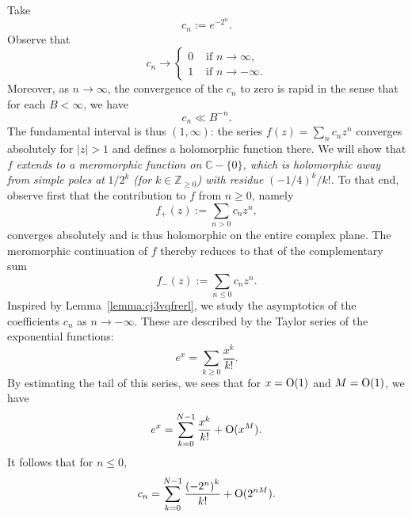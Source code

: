 \documentclass[reqno]{amsart}  \numberwithin{theorem}{section} \numberwithin{equation}{section}
\begin{document}
\begin{example}
  Take
  \begin{equation*}
    c_n:= e^{- 2^n }.
  \end{equation*}
  Observe that
  \begin{equation*}
    c_n \rightarrow
    \begin{cases}
      0 &  \text{ if } n \rightarrow \infty, \\
      1 & \text{ if } n \rightarrow - \infty.
    \end{cases}
  \end{equation*}
  Moreover, as $n \rightarrow \infty$, the convergence of the $c_n$ to zero is rapid in the sense that for each $B < \infty$, we have
  \begin{equation*}
    c_n \ll B^{-n}.
  \end{equation*}
  The fundamental interval is thus $(1,\infty)$: the series $f(z) = \sum_{n} c_n z^n$ converges absolutely for $|z| > 1$ and defines a holomorphic function there.  We will show that $f$ \emph{extends to a meromorphic function on} $\mathbb{C} - \{0\}$\emph{, which is holomorphic away from simple poles at} $1 / 2^k$ \emph{(for} $k \in \mathbb{Z}_{\geq 0}$\emph{) with residue} $(-1/4)^k / k!$\emph{.}  To that end, observe first that the contribution to $f$ from $n \geq 0$, namely
  \begin{equation*}
f_+(z) := \sum_{n > 0} c_n z^n,
\end{equation*}
converges absolutely and is thus holomorphic on the entire complex plane.  The meromorphic continuation of $f$ thereby reduces to that of the complementary sum
\begin{equation*}
f_-(z) := \sum_{n \leq  0} c_n z^n.
\end{equation*}
Inspired by Lemma~\ref{lemma:cj3vqfrerl}, we study the asymptotics of the coefficients $c_n$ as $n \rightarrow - \infty$.  These are described by the Taylor series of the exponential functions:
  \begin{equation*}
e^{x} = \sum_{k \geq 0} \frac{x^k }{k!}.
\end{equation*}
By estimating the tail of this series, we sees that for $x = \operatorname{O}(1)$ and $M = \operatorname{O}(1)$, we have
\begin{equation*}
e^x = \sum_{k = 0}^{N-1} \frac{x^k}{k!} + \operatorname{O} (x^M).
\end{equation*}
It follows that for $n \leq 0$,
\begin{equation}\label{eq:cj3wnu8lqf}
c_n = \sum_{k = 0}^{N-1} \frac{{(-2^n)}^k}{k!} + \operatorname{O} (2^{nM}).
\end{equation}

\end{example}
\end{document}

